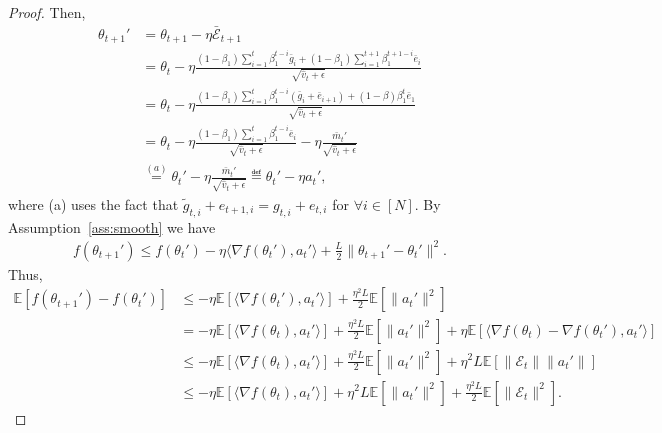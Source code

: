 \documentclass[11pt]{article}
\begin{document}
\begin{proof}
Then, 
\begin{align*}
    \theta_{t+1}'&=\theta_{t+1}-\eta\bar{\mathcal E}_{t+1}\\
    &=\theta_t-\eta\frac{(1-\beta_1)\sum_{i=1}^{t} \beta_1^{t-i}\bar g_i+(1-\beta_1)\sum_{i=1}^{t+1} \beta_1^{t+1-i}\bar e_i}{\sqrt{\hat v_t+\epsilon}}\\
    &=\theta_t-\eta\frac{(1-\beta_1)\sum_{i=1}^{t} \beta_1^{t-i}(\bar g_i+\bar e_{i+1})+(1-\beta)\beta_1^t \bar e_1}{\sqrt{\hat v_t+\epsilon}}\\
    &=\theta_t-\eta\frac{(1-\beta_1)\sum_{i=1}^{t} \beta_1^{t-i} \bar e_i}{\sqrt{\hat v_t+\epsilon}}-\eta\frac{\bar m_t'}{\sqrt{\hat v_t+\epsilon}}\\
    &\overset{(a)}{=}\theta_t'-\eta\frac{\bar m_t'}{\sqrt{\hat v_t+\epsilon}}\eqdef \theta_t'-\eta a_t',
\end{align*}
where (a) uses the fact that $\tilde g_{t,i}+e_{t+1,i}=g_{t,i}+e_{t,i}$ for $\forall i\in [N]$. By Assumption~\ref{ass:smooth} we have
\begin{align*}
    f(\theta_{t+1}')\leq f(\theta_t')-\eta\langle \nabla f(\theta_t'), a_t'\rangle+\frac{L}{2}\| \theta_{t+1}'-\theta_t'\|^2.
\end{align*}
Thus,
\begin{align}
    \mathbb E[f(\theta_{t+1}')-f(\theta_t')]&\leq -\eta\mathbb E[\langle \nabla f(\theta_t'), a_t'\rangle]+\frac{\eta^2L}{2}\mathbb E[\|a_t'\|^2] \nonumber\\
    &=-\eta\mathbb E[\langle \nabla f(\theta_t), a_t'\rangle]+\frac{\eta^2L}{2}\mathbb E[\|a_t'\|^2]+\eta\mathbb E[\langle \nabla f(\theta_t)-\nabla f(\theta_t'),a_t'\rangle] \nonumber\\
    &\leq -\eta\mathbb E[\langle \nabla f(\theta_t), a_t'\rangle]+\frac{\eta^2L}{2}\mathbb E[\|a_t'\|^2]+\eta^2 L\mathbb E[\| \mathcal E_t\| \|a_t'\|] \nonumber\\
    &\leq -\eta\mathbb E[\langle \nabla f(\theta_t), a_t'\rangle]+\eta^2L \mathbb E[\|a_t'\|^2]+\frac{\eta^2 L}{2}\mathbb E[\| \mathcal E_t\|^2]. \label{eq0}
\end{align}


\end{proof}
\end{document}
